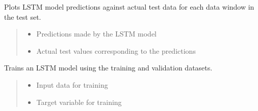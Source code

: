 \documentclass[letterpaper,10pt,english]{sphinxmanual}
\begin{document}
\begin{fulllineitems}
\begin{fulllineitems}
\label{\detokenize{docs/LSTM_model:LSTM_model.LSTM_Predictor.plot_predictions}}
\pysigstartsignatures
{}
\pysigstopsignatures
\sphinxAtStartPar
Plots LSTM model predictions against actual test data for each data window in the test set.
\begin{quote}\begin{description}
\begin{itemize}
\item {} 
\sphinxAtStartPar
{} \textendash{} Predictions made by the LSTM model

\item {} 
\sphinxAtStartPar
{} \textendash{} Actual test values corresponding to the predictions

\end{itemize}

\end{description}\end{quote}

\end{fulllineitems}


\begin{fulllineitems}
\label{\detokenize{docs/LSTM_model:LSTM_model.LSTM_Predictor.train_model}}
\pysigstartsignatures
{}
\pysigstopsignatures
\sphinxAtStartPar
Trains an LSTM model using the training and validation datasets.
\begin{quote}\begin{description}
\begin{itemize}
\item {} 
\sphinxAtStartPar
{} \textendash{} Input data for training

\item {} 
\sphinxAtStartPar
{} \textendash{} Target variable for training


\end{itemize}
\end{description}
\end{quote}
\end{fulllineitems}
\end{fulllineitems}
\end{document}
